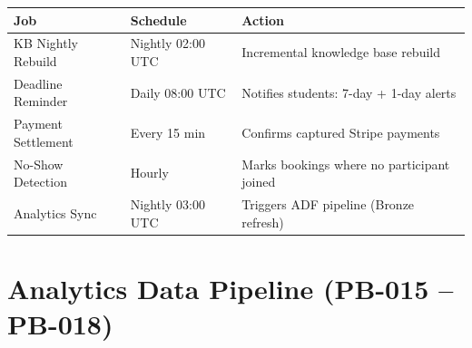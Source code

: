 \documentclass[11pt,a4paper]{article}
\begin{document}
\begin{center}
\begin{tabular}{lll}
\toprule
\textbf{Job} & \textbf{Schedule} & \textbf{Action}\\
\midrule
KB Nightly Rebuild & Nightly 02:00 UTC & Incremental knowledge base rebuild\\
Deadline Reminder & Daily 08:00 UTC & Notifies students: 7-day + 1-day alerts\\
Payment Settlement & Every 15 min & Confirms captured Stripe payments\\
No-Show Detection & Hourly & Marks bookings where no participant joined\\
Analytics Sync & Nightly 03:00 UTC & Triggers ADF pipeline (Bronze refresh)\\
\bottomrule
\end{tabular}
\end{center}

\section{Analytics Data Pipeline (PB-015 -- PB-018)}
\end{document}
